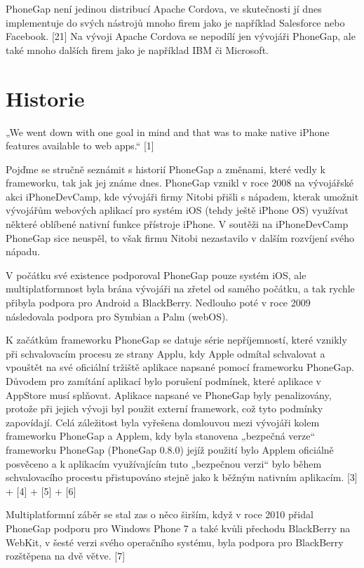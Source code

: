 PhoneGap není jedinou distribucí Apache Cordova, ve skutečnosti jí dnes implementuje do svých nástrojů mnoho firem jako je například Salesforce nebo Facebook. [21] Na vývoji Apache Cordova se nepodílí jen vývojáři PhoneGap, ale také mnoho dalších firem jako je například IBM či Microsoft.

\section{Historie}
„We went down with one goal in mind and that was to make native iPhone features available to web apps.“ [1]

Pojďme se stručně seznámit s historií PhoneGap a změnami, které vedly k frameworku, tak jak jej známe dnes. PhoneGap vznikl v roce 2008 na vývojářské akci iPhoneDevCamp, kde vývojáři firmy Nitobi přišli s nápadem, kterak umožnit vývojářům webových aplikací pro systém iOS (tehdy ještě iPhone OS) využívat některé oblíbené nativní funkce přístroje iPhone. V soutěži na iPhoneDevCamp PhoneGap sice neuspěl, to však firmu Nitobi nezastavilo v dalším rozvíjení svého nápadu.

V počátku své existence podporoval PhoneGap pouze systém iOS, ale multiplatformnost byla brána vývojáři na zřetel od samého počátku, a tak rychle přibyla podpora pro Android a BlackBerry. Nedlouho poté v roce 2009 následovala podpora pro Symbian a Palm (webOS).

K začátkům frameworku PhoneGap se datuje série nepříjemností, které vznikly při schvalovacím procesu ze strany Applu, kdy Apple odmítal schvalovat a vpouštět na své oficiální tržiště aplikace napsané pomocí frameworku PhoneGap. Důvodem pro zamítání aplikací bylo porušení podmínek, které aplikace v AppStore musí splňovat. Aplikace napsané ve PhoneGap byly penalizovány, protože při jejich vývoji byl použit externí framework, což tyto podmínky zapovídají. Celá záležitost byla vyřešena domlouvou mezi vývojáři kolem frameworku PhoneGap a Applem, kdy byla stanovena „bezpečná verze“ frameworku PhoneGap (PhoneGap 0.8.0) jejíž použití bylo Applem oficiálně posvěceno a k aplikacím využívajícím tuto „bezpečnou verzi“ bylo během schvalovacího procestu přistupováno stejně jako k běžným nativním aplikacím. [3] + [4] + [5] + [6]

Multiplatformní záběr se stal zas o něco širším, když v roce 2010 přidal PhoneGap podporu pro Windows Phone 7 a také kvůli přechodu BlackBerry na WebKit, v šesté verzi svého operačního systému, byla podpora pro BlackBerry rozštěpena na dvě větve. [7]

